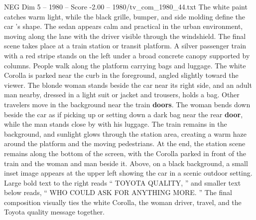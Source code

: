 \begin{textsample}{NEG Dim 5 – 1980 – Score -2.00 – 1980/tv\_com\_1980\_44.txt}
The white paint catches warm light, while the black grille, bumper, and side molding define the car ’s shape.
The sedan appears calm and practical in the urban environment, moving along the lane with the driver visible through the windshield.
The final scene takes place at a train station or transit platform.
A silver passenger train with a red stripe stands on the left under a broad concrete canopy supported by columns.
People walk along the platform carrying bags and luggage.
The white Corolla is parked near the curb in the foreground, angled slightly toward the viewer.
The blonde woman stands beside the car near its right side, and an adult man nearby, dressed in a light suit or jacket and trousers, holds a bag.
Other travelers move in the background near the train \textbf{doors}.
The woman bends down beside the car as if picking up or setting down a dark bag near the rear \textbf{door}, while the man stands close by with his luggage.
The train remains in the background, and sunlight glows through the station area, creating a warm haze around the platform and the moving pedestrians.
At the end, the station scene remains along the bottom of the screen, with the Corolla parked in front of the train and the woman and man beside it.
Above, on a black background, a small inset image appears at the upper left showing the car in a scenic outdoor setting.
Large bold text to the right reads “ TOYOTA QUALITY, ” and smaller text below reads, “ WHO COULD ASK FOR ANYTHING MORE. ” The final composition visually ties the white Corolla, the woman driver, travel, and the Toyota quality message together.

\end{textsample}
